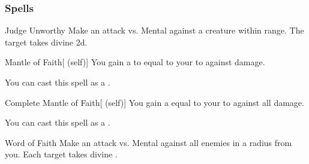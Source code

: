 \subsubsection{Spells}


\lowercase{\hypertarget{spell:Judge Unworthy}{}}\label{spell:Judge Unworthy}
\begin{apability}[\nth{1}]{\hypertarget{spell:Judge Unworthy}{Judge Unworthy}}
Make an attack vs. Mental against a creature within \rngmed range.
\hit The target takes divine  \plus2d.
\end{apability}
\vspace{0.25em}



\lowercase{\hypertarget{spell:Mantle of Faith}{}}\label{spell:Mantle of Faith}
\begin{attuneability}[\nth{1}]{\hypertarget{spell:Mantle of Faith}{Mantle of Faith}}[ (self)]
You gain a  to equal to your  to  against  damage.

You can cast this spell as a .
\end{attuneability}
\vspace{0.25em}



\lowercase{\hypertarget{spell:Complete Mantle of Faith}{}}\label{spell:Complete Mantle of Faith}
\begin{attuneability}[\nth{2}]{\hypertarget{spell:Complete Mantle of Faith}{Complete Mantle of Faith}}[ (self)]
You gain a  equal to your  to  against all damage.

You can cast this spell as a .
\end{attuneability}
\vspace{0.25em}



\lowercase{\hypertarget{spell:Word of Faith}{}}\label{spell:Word of Faith}
\begin{apability}[\nth{2}]{\hypertarget{spell:Word of Faith}{Word of Faith}}
Make an attack vs. Mental against all enemies in a \areamed radius from you.
\hit Each target takes divine .
\end{apability}
\vspace{0.25em}



